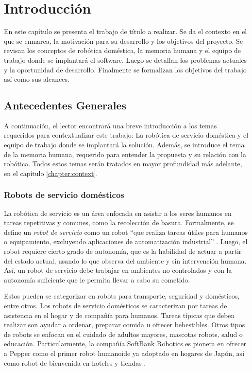 
\chapter{Introducción}\label{chapter:introduction}

En este capítulo se presenta el trabajo de título a realizar. Se da el contexto en el que se enmarca, la motivación para su desarrollo y los objetivos del proyecto. Se revisan los conceptos de robótica doméstica, la memoria humana y el equipo de trabajo donde se implantará el software. Luego se detallan los problemas actuales y la oportunidad de desarrollo. Finalmente se formalizan los objetivos del trabajo así como sus alcances.


\section{Antecedentes Generales}

A continuación, el lector encontrará una breve introducción a los temas requeridos para contextualizar este trabajo: La robótica de servicio doméstica y el equipo de trabajo donde se implantará la solución. Además, se introduce el tema de la memoria humana, requerido para entender la propuesta y su relación con la robótica. Todos estos temas serán tratados en mayor profundidad más adelante, en el capítulo \ref{chapter:context}.

\subsection{Robots de servicio domésticos}

La robótica de servicio es un área enfocada en asistir a los seres humanos en tareas repetitivas y comunes, como la recolección de basura. Formalmente, se define un \textit{robot de servicio} como un robot ``que realiza tareas útiles para humanos o equipamiento, excluyendo aplicaciones de automatización industrial'' \cite{IFR}. Luego, el robot requiere cierto grado de autonomía, que es la habilidad de actuar a partir del estado actual, usando lo que observa del ambiente y sin intervención humana. Así, un robot de servicio debe trabajar en ambientes no controlados y con la autonomía suficiente que le permita llevar a cabo su cometido.

Estos pueden se categorizar en robots para transporte, seguridad y domésticos, entre otros. Los robots de servicio domésticos se caracterizan por tareas de asistencia en el hogar y de compañía para humanos. Tareas típicas que deben realizar son ayudar a ordenar, preparar comida u ofrecer bebestibles. Otros tipos de robots se enfocan en el cuidado de adultos mayores, mascotas robots, salud o educación. Particularmente, la compañía SoftBank Robotics es pionera en ofrecer a Pepper como el primer robot humanoide ya adoptado en hogares de Japón, así como robot de bienvenida en hoteles y tiendas \cite{softbank}.


